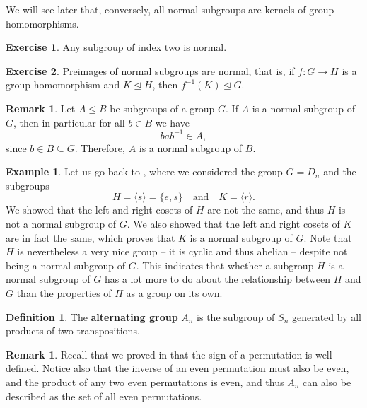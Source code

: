 \documentclass[12pt]{report}
\numberwithin{equation}{section}
\numberwithin{theorem}{chapter}
\theoremstyle{definition}
\newtheorem{definition}[theorem]{Definition}
\newtheorem{example}[theorem]{Example}
\newtheorem{exercise}{Exercise}
\newtheorem*{basic properties}{Basic Properties}
\newtheorem*{Important Remark}{Important Remark}
\newtheorem{remark}[theorem]{Remark}
\newcommand{\df}[1]{{\bf #1}\index{#1}}
\def\norm{\mathrel{\unlhd}}
\begin{document}
We will see later that, conversely, all normal subgroups are kernels of group homomorphisms.

\begin{exercise}\label{index 2 normal}
	Any subgroup of index two is normal.
\end{exercise}


\begin{exercise}\label{preimage of normal subgroup is normal}
Preimages of normal subgroups are normal, that is, if $f:G\to H$ is a group homomorphism and $K\norm H$, then $f^{-1}(K)\norm G$.	
\end{exercise}


\begin{remark}\label{normal subgroup is also normal in smaller group}
	Let $A \leq B$ be subgroups of a group $G$. If $A$ is a normal subgroup of $G$, then in particular for all $b \in B$ we have
	$$bab^{-1} \in A,$$
	since $b \in B \subseteq G$. Therefore, $A$ is a normal subgroup of $B$.
\end{remark}

\begin{example}\label{normal subgroups of D_n}
	Let us go back to , where we considered the group $G =D_{n}$ and the subgroups 
	$$H = \langle s \rangle = \{e,s\} \quad \textrm{and} \quad K = \langle r \rangle.$$
	We showed that the left and right cosets of $H$ are not the same, and thus $H$ is not a normal subgroup of $G$. We also showed that the left and right cosets of $K$ are in fact the same, which proves that $K$ is a normal subgroup of $G$. Note that $H$ is nevertheless a very nice group -- it is cyclic and thus abelian -- despite not being a normal subgroup of $G$. This indicates that whether a subgroup $H$ is a normal subgroup of $G$ has a lot more to do about the relationship between $H$ and $G$ than the properties of $H$ as a group on its own.
\end{example}


\begin{definition}
The \df{alternating group} $A_n$ is the subgroup of $S_n$ generated by all products of two transpositions.
\end{definition}


\begin{remark}
Recall that we proved in  that the sign of a permutation is well-defined. Notice also that the inverse of an even permutation must also be even, and the product of any two even permutations is even, and thus $A_n$ can also be described as the set of all even permutations.
\end{remark}
\end{document}
